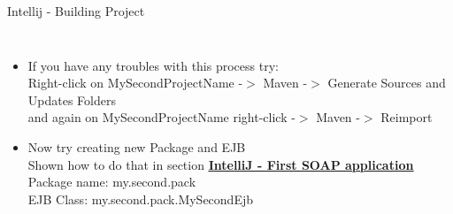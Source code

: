 \documentclass[aspectratio=1610,english]{beamer} %
\begin{document}
\begin{frame}{Intellij - Building Project}
\begin{columns}
				\begin{itemize}
					\tiny
					\color{black}
					\item If you have any troubles with this process try: \\ 
					\color{gray}
						Right-click on MySecondProjectName -$>$ Maven -$>$ Generate Sources and Updates Folders \\
						and again on MySecondProjectName right-click -$>$ Maven -$>$ Reimport
					\color{black}
					\item Now try creating new Package and EJB \\ 
					\color{gray}
					\fontsize{4}{5} \selectfont 
					Shown how to do that in section 
					\hyperlink{page.17}{\textbf{\underline{IntelliJ - First SOAP application}}} \\ 
					Package name: my.second.pack  \\ 
					EJB Class: my.second.pack.MySecondEjb
				\end{itemize}
				\begin{minipage}{\textwidth}
				\end{minipage}
		\end{columns}
	\end{frame}
\end{document}
